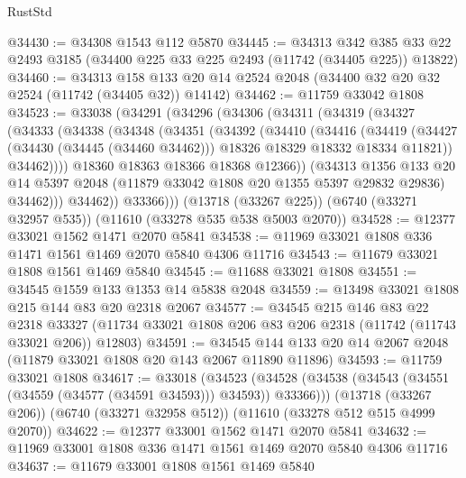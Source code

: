 \begin{lexlean}{RustStd}
\begin{coremodule}
@34430 := @34308 @1543 @112 @5870
@34445 := @34313
    @342
    @385
    @33
    @22
    @2493
    @3185
    (@34400 @225 @33 @225 @2493 (@11742 (@34405 @225)) @13822)
@34460 := @34313
    @158
    @133
    @20
    @14
    @2524
    @2048
    (@34400 @32 @20 @32 @2524 (@11742 (@34405 @32)) @14142)
@34462 := @11759 @33042 @1808
@34523 := @33038
    (@34291
      (@34296
        (@34306
          (@34311
            (@34319
              (@34327
                (@34333
                  (@34338
                    (@34348
                      (@34351
                        (@34392
                          (@34410
                            (@34416
                              (@34419
                                (@34427
                                  (@34430 (@34445 (@34460 @34462)))
                                  @18326
                                  @18329
                                  @18332
                                  @18334
                                  @11821))
                              @34462))))
                      @18360
                      @18363
                      @18366
                      @18368
                      @12366))
                  (@34313
                    @1356
                    @133
                    @20
                    @14
                    @5397
                    @2048
                    (@11879 @33042 @1808 @20 @1355 @5397 @29832 @29836)
                    @34462)))
              @34462))
          @33366)))
    (@13718 (@33267 @225))
    (@6740 (@33271 @32957 @535))
    (@11610 (@33278 @535 @538 @5003 @2070))
@34528 := @12377 @33021 @1562 @1471 @2070 @5841
@34538 := @11969 @33021 @1808 @336 @1471 @1561 @1469 @2070 @5840 @4306 @11716
@34543 := @11679 @33021 @1808 @1561 @1469 @5840
@34545 := @11688 @33021 @1808
@34551 := @34545 @1559 @133 @1353 @14 @5838 @2048
@34559 := @13498 @33021 @1808 @215 @144 @83 @20 @2318 @2067
@34577 := @34545
    @215
    @146
    @83
    @22
    @2318
    @33327
    (@11734 @33021 @1808 @206 @83 @206 @2318 (@11742 (@11743 @33021 @206)) @12803)
@34591 := @34545 @144 @133 @20 @14 @2067 @2048 (@11879 @33021 @1808 @20 @143 @2067 @11890 @11896)
@34593 := @11759 @33021 @1808
@34617 := @33018
    (@34523 (@34528 (@34538 (@34543 (@34551 (@34559 (@34577 (@34591 @34593))) @34593)) @33366)))
    (@13718 (@33267 @206))
    (@6740 (@33271 @32958 @512))
    (@11610 (@33278 @512 @515 @4999 @2070))
@34622 := @12377 @33001 @1562 @1471 @2070 @5841
@34632 := @11969 @33001 @1808 @336 @1471 @1561 @1469 @2070 @5840 @4306 @11716
@34637 := @11679 @33001 @1808 @1561 @1469 @5840

\end{coremodule}
\end{lexlean}
